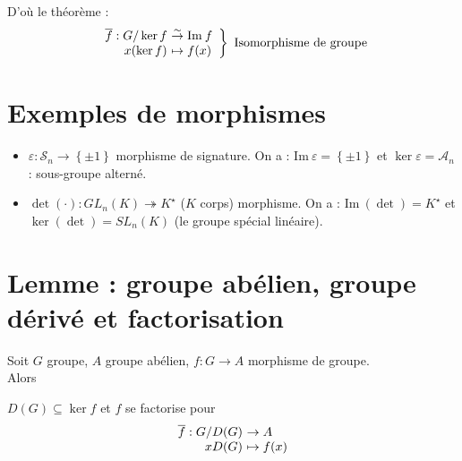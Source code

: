 \documentclass[a4paper,10pt]{report}
\newcommand{\set}[1]{\left\lbrace #1 \right\rbrace } %
\newcommand{\im}{\mathrm{Im}\:} %
\newcommand{\surj}{\twoheadrightarrow}
\newcommand{\bij}{\overset{\sim}{\to}} %
\newcommand{\mfootnote}[1]{\up{(}\footnote{#1}\up{)}}
\begin{document}
   D'où le théorème :
   $$\left.
   \begin{array}{r@{\ }l}
     \overline{f} : G/\ker f & \bij \im f\\
     x(\ker f) & \mapsto f(x)
   \end{array}
   \right\} \text{ Isomorphisme de groupe}$$

  \section{Exemples de morphismes}
   \begin{itemize}
     \item $\varepsilon : \mathcal{S}_n \to \set{\pm 1}$ morphisme
       de signature. On a : $\im \varepsilon = \set{\pm 1}$ et
       $\ker \varepsilon = \mathcal{A}_n$ : sous-groupe alterné.
     \item $\det (\cdot) : GL_n(K) \surj K^\star$ ($K$ corps) morphisme. On a :
       $\im(\det)=K^\star$ et $\ker(\det)=SL_n(K)$ (le groupe spécial linéaire).
   \end{itemize}

  \section{Lemme : groupe abélien, groupe dérivé et factorisation}
   Soit $G$ groupe, $A$ groupe abélien, $f: G \to A$ morphisme de groupe.\\
   Alors
   \begin{comment}
     \mfootnote{Preuve: 29/10/08 p2} 
   \end{comment}
   $D(G) \subseteq \ker f$ et $f$ se factorise pour 
   $$\begin{array}[t]{r@{\ }l}
     \overline{f} : G/D(G) & \to A\\
     xD(G) & \mapsto f(x)
   \end{array}$$
\end{document}
